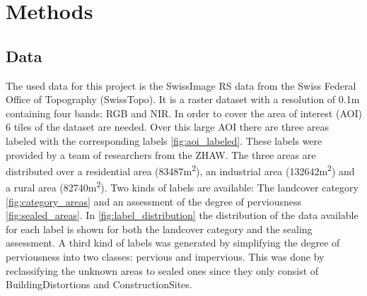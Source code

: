 

\section{Methods}
\label{methods}

\subsection{Data}%

The used data for this project is the SwissImage RS \autocite{swisstopoSWISSIMAGERS2024}
data from the Swiss Federal Office of Topography (SwissTopo).
It is a raster dataset with a resolution of 0.1m containing four bands: RGB and NIR.
In order to cover the area of interest (AOI) 6 tiles of the dataset are needed.
Over this large AOI there are three areas labeled with the corresponding labels \autoref{fig:aoi_labeled}.
These labels were provided by a team of researchers from the ZHAW. The three
areas are distributed over a residential area (83487m\textsuperscript{2}),
an industrial area (132642m\textsuperscript{2}) and a rural area (82740m\textsuperscript{2}).
Two kinds of labels are available: The landcover category \autoref{fig:category_areas} and an assessment of the 
degree of perviousness \autoref{fig:sealed_areas}. In \autoref{fig:label_distribution} the distribution of
the data available for each label is shown for both the landcover category and the sealing assessment.
A third kind of labels was generated by simplifying the degree of perviousness into two classes: pervious and impervious.
This was done by reclassifying the unknown areas to sealed ones since they only consist of BuildingDistortions and
ConstructionSites.

